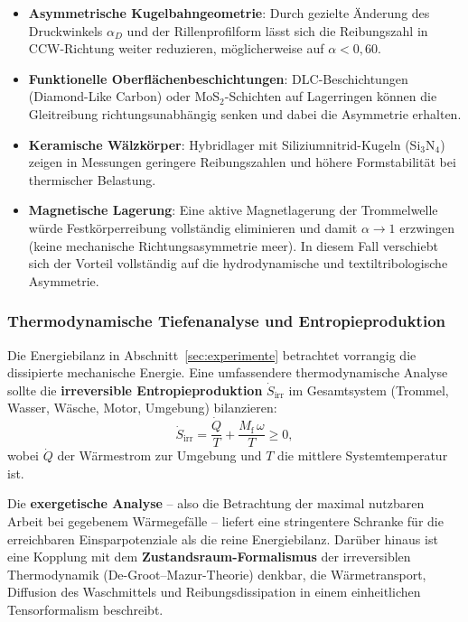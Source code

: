 ﻿\documentclass[12pt,a4paper]{article}
\theoremstyle{remark}
\begin{document}
	\begin{itemize}
		\item \textbf{Asymmetrische Kugelbahngeometrie}: Durch gezielte Änderung des
		Druckwinkels $\alpha_D$ und der Rillenprofilform lässt sich die Reibungszahl
		in CCW-Richtung weiter reduzieren, möglicherweise auf $\alpha < 0{,}60$.
		\item \textbf{Funktionelle Oberflächenbeschichtungen}: DLC-Beschichtungen
		(Diamond-Like Carbon) oder MoS$_2$-Schichten auf Lagerringen können die
		Gleitreibung richtungsunabhängig senken und dabei die Asymmetrie erhalten.
		\item \textbf{Keramische Wälzkörper}: Hybridlager mit Siliziumnitrid-Kugeln
		(Si$_3$N$_4$) zeigen in Messungen geringere Reibungszahlen und höhere Formstabilität
		bei thermischer Belastung.
		\item \textbf{Magnetische Lagerung}: Eine aktive Magnetlagerung der Trommelwelle
		würde Festkörperreibung vollständig eliminieren und damit $\alpha \to 1$ erzwingen
		(keine mechanische Richtungsasymmetrie meer). In diesem Fall verschiebt sich der
		Vorteil vollständig auf die hydrodynamische und textiltribologische Asymmetrie.
	\end{itemize}
	
	\subsubsection{Thermodynamische Tiefenanalyse und Entropieproduktion}
	
	Die Energiebilanz in Abschnitt~\ref{sec:experimente} betrachtet vorrangig die
	dissipierte mechanische Energie. Eine umfassendere thermodynamische Analyse sollte
	die \textbf{irreversible Entropieproduktion} $\dot{S}_{\mathrm{irr}}$ im Gesamtsystem
	(Trommel, Wasser, Wäsche, Motor, Umgebung) bilanzieren:
	\begin{equation}
		\dot{S}_{\mathrm{irr}} = \frac{\dot{Q}}{T} + \frac{M_{\mathrm{f}}\,\omega}{T}
		\geq 0,
	\end{equation}
	wobei $\dot{Q}$ der Wärmestrom zur Umgebung und $T$ die mittlere Systemtemperatur ist.
	
	Die \textbf{exergetische Analyse} -- also die Betrachtung der maximal nutzbaren Arbeit
	bei gegebenem Wärmegefälle -- liefert eine stringentere Schranke für die erreichbaren
	Einsparpotenziale als die reine Energiebilanz.
	Darüber hinaus ist eine Kopplung mit dem \textbf{Zustandsraum-Formalismus} der
	irreversiblen Thermodynamik (De-Groot--Mazur-Theorie) denkbar, die Wärmetransport,
	Diffusion des Waschmittels und Reibungsdissipation in einem einheitlichen
	Tensorformalism beschreibt.
	
\end{document}
